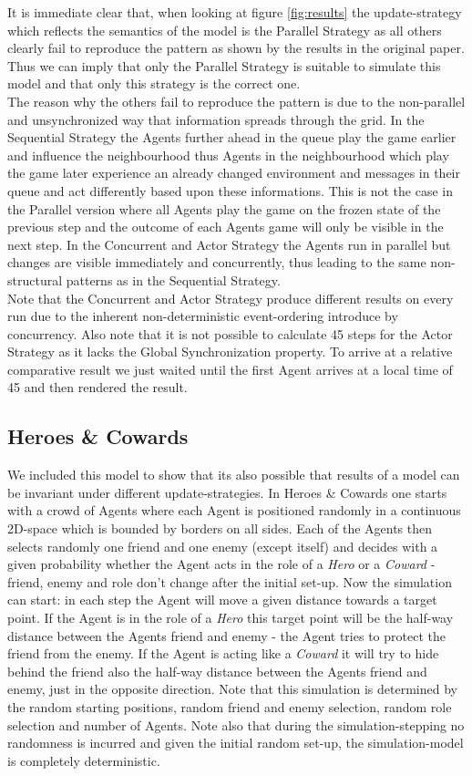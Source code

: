 It is immediate clear that, when looking at figure \ref{fig:results} the update-strategy which reflects the semantics of the model is the Parallel Strategy as all others clearly fail to reproduce the pattern as shown by the results in the original paper. Thus we can imply that only the Parallel Strategy is suitable to simulate this model and that only this strategy is the correct one. \\
The reason why the others fail to reproduce the pattern is due to the non-parallel and unsynchronized way that information spreads through the grid. In the Sequential Strategy the Agents further ahead in the queue play the game earlier and influence the neighbourhood thus Agents in the neighbourhood which play the game later experience an already changed environment and  messages in their queue and act differently based upon these informations. This is not the case in the Parallel version where all Agents play the game on the frozen state of the previous step and the outcome of each Agents game will only be visible in the next step. In the Concurrent and Actor Strategy the Agents run in parallel but changes are visible immediately and concurrently, thus leading to the same non-structural patterns as in the Sequential Strategy. \\
Note that the Concurrent and Actor Strategy produce different results on every run due to the inherent non-deterministic event-ordering introduce by concurrency. Also note that it is not possible to calculate 45 steps for the Actor Strategy as it lacks the Global Synchronization property. To arrive at a relative comparative result we just waited until the first Agent arrives at a local time of 45 and then rendered the result. 

\subsection{Heroes \& Cowards}
We included this model to show that its also possible that results of a model can be invariant under different update-strategies. In Heroes \& Cowards one starts with a crowd of Agents where each Agent is positioned randomly in a continuous 2D-space which is bounded by borders on all sides. Each of the Agents then selects randomly one friend and one enemy (except itself) and decides with a given probability whether the Agent acts in the role of a \textit{Hero} or a \textit{Coward} - friend, enemy and role don't change after the initial set-up. Now the simulation can start: in each step the Agent will move a given distance towards a target point. If the Agent is in the role of a \textit{Hero} this target point will be the half-way distance between the Agents friend and enemy - the Agent tries to protect the friend from the enemy. If the Agent is acting like a \textit{Coward} it will try to hide behind the friend also the half-way distance between the Agents friend and enemy, just in the opposite direction. Note that this simulation is determined by the random starting positions, random friend and enemy selection, random role selection and number of Agents. Note also that during the simulation-stepping no randomness is incurred and given the initial random set-up, the simulation-model is completely deterministic. \\

